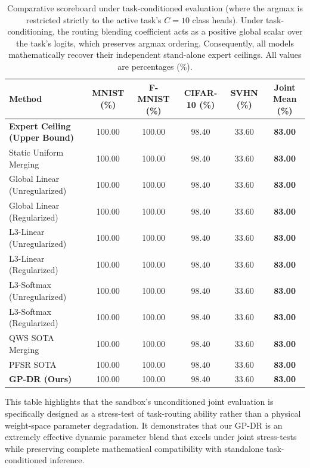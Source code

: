 \documentclass{article}
\theoremstyle{plain}
\theoremstyle{definition}
\theoremstyle{remark}
\begin{document}
\begin{table}[h]
\caption{Comparative scoreboard under task-conditioned evaluation (where the argmax is restricted strictly to the active task's $C=10$ class heads). Under task-conditioning, the routing blending coefficient acts as a positive global scalar over the task's logits, which preserves argmax ordering. Consequently, all models mathematically recover their independent stand-alone expert ceilings. All values are percentages (\%).}
\label{tab:conditioned_scoreboard}
\vskip 0.15in
\begin{center}
\begin{small}
\begin{sc}
\begin{tabular}{lccccc}
\toprule
Method & MNIST (\%) & F-MNIST (\%) & CIFAR-10 (\%) & SVHN (\%) & Joint Mean (\%) \\
\midrule
\textbf{Expert Ceiling (Upper Bound)} & 100.00 & 100.00 & 98.40 & 33.60 & \textbf{83.00} \\
\midrule
Static Uniform Merging & 100.00 & 100.00 & 98.40 & 33.60 & \textbf{83.00} \\
Global Linear (Unregularized) & 100.00 & 100.00 & 98.40 & 33.60 & \textbf{83.00} \\
Global Linear (Regularized) & 100.00 & 100.00 & 98.40 & 33.60 & \textbf{83.00} \\
L3-Linear (Unregularized) & 100.00 & 100.00 & 98.40 & 33.60 & \textbf{83.00} \\
L3-Linear (Regularized) & 100.00 & 100.00 & 98.40 & 33.60 & \textbf{83.00} \\
L3-Softmax (Unregularized) & 100.00 & 100.00 & 98.40 & 33.60 & \textbf{83.00} \\
L3-Softmax (Regularized) & 100.00 & 100.00 & 98.40 & 33.60 & \textbf{83.00} \\
QWS SOTA Merging & 100.00 & 100.00 & 98.40 & 33.60 & \textbf{83.00} \\
PFSR SOTA & 100.00 & 100.00 & 98.40 & 33.60 & \textbf{83.00} \\
\midrule
\textbf{GP-DR (Ours)} & 100.00 & 100.00 & 98.40 & 33.60 & \textbf{83.00} \\
\bottomrule
\end{tabular}
\end{sc}
\end{small}
\end{center}
\vskip -0.1in
\end{table}

This table highlights that the sandbox's unconditioned joint evaluation is specifically designed as a stress-test of task-routing ability rather than a physical weight-space parameter degradation. It demonstrates that our GP-DR is an extremely effective dynamic parameter blend that excels under joint stress-tests while preserving complete mathematical compatibility with standalone task-conditioned inference.

\end{document}
